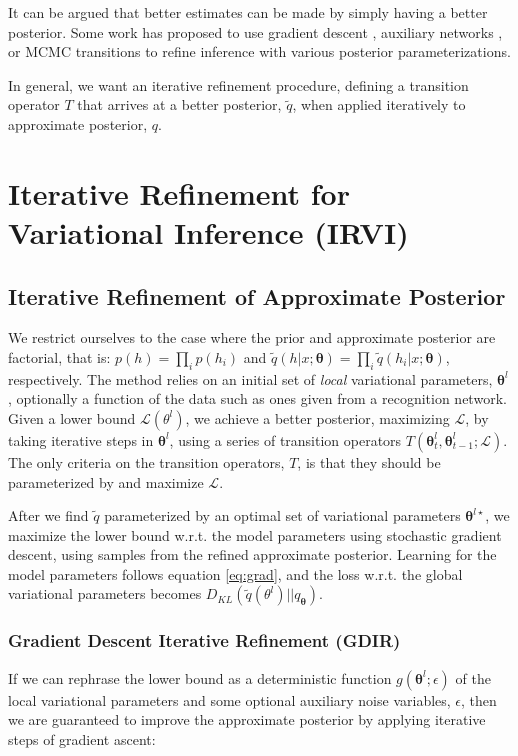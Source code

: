 \documentclass{article} %
\newcommand{\vects}[1]{\boldsymbol{#1}}
\newcommand{\TT}[0]{\vects{\theta}}
\newcommand{\LL}[0]{\mathcal{L}}
\begin{document}
It can be argued that better estimates can be made by simply having a better
posterior. Some work has proposed to use gradient descent
\citep{hoffman2013stochastic}, auxiliary networks
\citep{rezende2015variational}, or MCMC transitions \citep{icml2015_salimans15}
to refine inference with various posterior parameterizations. 

In general, we want an iterative refinement procedure, defining a transition
operator $T$ that arrives at a better posterior, $\tilde{q}$, when applied
iteratively to approximate posterior, $q$. 

\section{Iterative Refinement for Variational Inference (IRVI)}

\subsection{Iterative Refinement of Approximate Posterior}
We restrict ourselves to the case where the prior and approximate posterior are
factorial, that is: $p(h) = \prod_i p(h_i)$ and $\tilde{q}(h|x; \TT) = \prod_i
\tilde{q}(h_i|x; \TT)$, respectively. The method relies on an initial set of \emph{local} variational parameters, $\TT^l$, optionally a function of the data
such as ones given from a recognition network. Given a lower bound $\LL(\theta^l)$, we achieve a better posterior, maximizing $\LL$, by taking iterative steps 
in $\TT^l$, using a series of transition operators $T(\TT^l_t, \TT^l_{t-1}; \LL)$. 
The only criteria on the transition operators, $T$, is that they should be parameterized by and maximize $\LL$.

After we find $\tilde{q}$ parameterized by an optimal set of variational parameters $\TT^{l\star}$, we maximize the lower bound w.r.t. the model
parameters using stochastic gradient descent, using samples from the refined
approximate posterior. Learning for the model parameters follows equation \ref{eq:grad}, and the loss w.r.t. the global variational parameters becomes
$D_{KL}(\tilde{q}(\theta^l)||q_{\TT})$.

\subsubsection{Gradient Descent Iterative Refinement (GDIR)}
If we can rephrase the lower bound as a deterministic function $g(\TT^l; \epsilon)$ of the local
variational parameters and some optional auxiliary noise variables, $\epsilon$,
then we are guaranteed to improve the approximate posterior by applying iterative steps
of gradient ascent:
\end{document}
